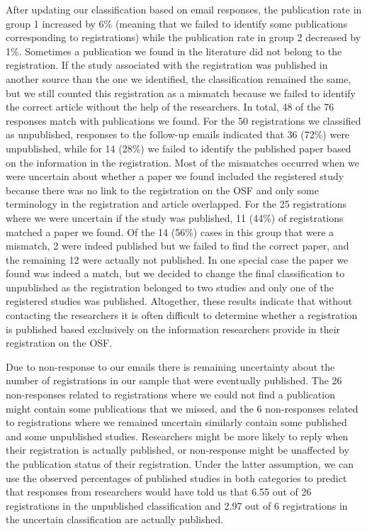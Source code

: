 \documentclass[
  ,jou, a4paper,floatsintext]{apa6}
\begin{document}
After updating our classification based on email responses, the publication rate in group 1 increased by 6\% (meaning that we failed to identify some publications corresponding to registrations) while the publication rate in group 2 decreased by 1\%. Sometimes a publication we found in the literature did not belong to the registration. If the study associated with the registration was published in another source than the one we identified, the classification remained the same, but we still counted this registration as a mismatch because we failed to identify the correct article without the help of the researchers. In total, 48 of the 76 responses match with publications we found. For the 50 registrations we classified as unpublished, responses to the follow-up emails indicated that 36 (72\%) were unpublished, while for 14 (28\%) we failed to identify the published paper based on the information in the registration. Most of the mismatches occurred when we were uncertain about whether a paper we found included the registered study because there was no link to the registration on the OSF and only some terminology in the registration and article overlapped. For the 25 registrations where we were uncertain if the study was published, 11 (44\%) of registrations matched a paper we found. Of the 14 (56\%) cases in this group that were a mismatch, 2 were indeed published but we failed to find the correct paper, and the remaining 12 were actually not published. In one special case the paper we found was indeed a match, but we decided to change the final classification to unpublished as the registration belonged to two studies and only one of the registered studies was published. Altogether, these results indicate that without contacting the researchers it is often difficult to determine whether a registration is published based exclusively on the information researchers provide in their registration on the OSF.

Due to non-response to our emails there is remaining uncertainty about the number of registrations in our sample that were eventually published. The 26 non-responses related to registrations where we could not find a publication might contain some publications that we missed, and the 6 non-responses related to registrations where we remained uncertain similarly contain some published and some unpublished studies. Researchers might be more likely to reply when their registration is actually published, or non-response might be unaffected by the publication status of their registration. Under the latter assumption, we can use the observed percentages of published studies in both categories to predict that responses from researchers would have told us that 6.55 out of 26 registrations in the unpublished classification and 2.97 out of 6 registrations in the uncertain classification are actually published.
\end{document}
